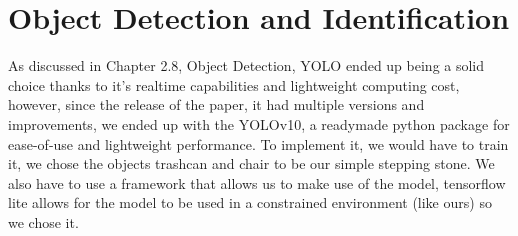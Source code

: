 \section{Object Detection and Identification}
As discussed in Chapter 2.8, Object Detection, YOLO ended up being a solid choice thanks to it's realtime capabilities and lightweight computing cost, however, since the release of the paper, it had multiple versions and improvements, we ended up with the YOLOv10, a readymade python package for ease-of-use and lightweight performance. To implement it, we would have to train it, we chose the objects trashcan and chair to be our simple stepping stone. We also have to use a framework that allows us to make use of the model, tensorflow lite allows for the model to be used in a constrained environment (like ours) so we chose it.
